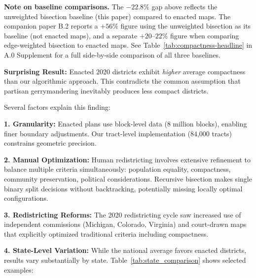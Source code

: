 \noindent\textbf{Note on baseline comparisons.} The $-22.8\%$ gap above reflects the unweighted bisection baseline (this paper) compared to enacted maps. The companion paper B.2 reports a $+56\%$ figure using the unweighted bisection as its baseline (not enacted maps), and a separate $+20$--$22\%$ figure when comparing edge-weighted bisection to enacted maps. See Table~\ref{tab:compactness-headline} in A.0 Supplement for a full side-by-side comparison of all three baselines.

\textbf{Surprising Result:} Enacted 2020 districts exhibit \textit{higher} average compactness than our algorithmic approach. This contradicts the common assumption that partisan gerrymandering inevitably produces less compact districts.

Several factors explain this finding:

\textbf{1. Granularity:} Enacted plans use block-level data (8 million blocks), enabling finer boundary adjustments. Our tract-level implementation (84,000 tracts) constrains geometric precision.

\textbf{2. Manual Optimization:} Human redistricting involves extensive refinement to balance multiple criteria simultaneously: population equality, compactness, community preservation, political considerations. Recursive bisection makes single binary split decisions without backtracking, potentially missing locally optimal configurations.

\textbf{3. Redistricting Reforms:} The 2020 redistricting cycle saw increased use of independent commissions (Michigan, Colorado, Virginia) and court-drawn maps that explicitly optimized traditional criteria including compactness.

\textbf{4. State-Level Variation:} While the national average favors enacted districts, results vary substantially by state. Table~\ref{tab:state_comparison} shows selected examples:

